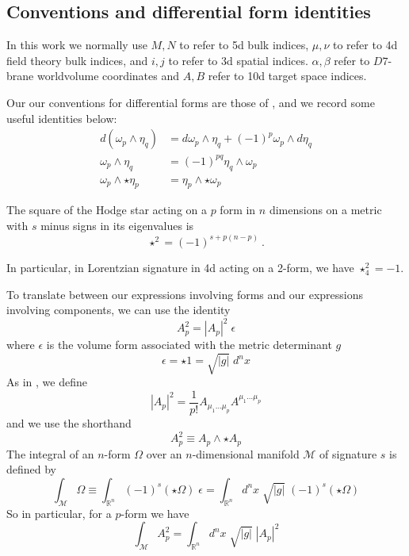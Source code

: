 \documentclass[aps,preprint,nofootinbib,preprintnumbers,eqsecnum,superscriptaddress]{revtex4}
\newcommand\om{\omega}
\begin{document}
\clearpage
\begin{appendix} 



\section{Conventions and differential form identities}
\label{conventions-appendix}
In this work we normally use $M,N$ to refer to 5d bulk indices, $\mu,\nu$ to refer to 4d field theory bulk indices, and $i,j$ to refer to 3d spatial indices. $\alpha, \beta$ refer to $D7$-brane worldvolume coordinates and $A, B$ refer to 10d target space indices.

Our our conventions for differential forms are those of \cite{carroll2004spacetime}, and we record some useful identities below:
\begin{align}
d(\om_p \wedge \eta_q) & = d\om_p \wedge \eta_q + (-1)^p \om_p \wedge d\eta_q \\
\om_p \wedge \eta_q & = (-1)^{pq} \eta_q \wedge \om_p \\
\om_p \wedge \star\eta_p & = \eta_p \wedge \star\om_p
\end{align}

The square of the Hodge star acting on a $p$ form in $n$ dimensions on a metric with $s$ minus signs in its eigenvalues is
\begin{equation}
\star^2 = (-1)^{s+p(n-p)} \ . 
\end{equation}

In particular, in Lorentzian signature in 4d acting on a 2-form, we have $\star_4^2 = -1$.

To translate between our expressions involving forms and our expressions involving components, we can use the identity
\begin{equation}
	A_p^2 = |A_p|^2 \; \epsilon
\end{equation}
where $\epsilon$ is the volume form associated with the metric determinant $g$
\begin{equation}
	\epsilon = \star 1 = \sqrt{|g|} \; d^n x
\end{equation}
As in \cite{Polchinski:1998rr}, we define
\begin{equation}
	|A_p|^2 = \frac{1}{p!}A_{\mu_1 \ldots \mu_p}A^{\mu_1 \ldots \mu_p}
\end{equation}
and we use the shorthand
\begin{equation}
	A_p^2 \equiv A_p \wedge \star A_p
\end{equation}
The integral of an $n$-form $\Omega$ over an $n$-dimensional manifold $\mathcal{M}$ of signature $s$ is defined by 
\begin{equation}
	\int_\mathcal{M} \Omega \equiv \int_{\mathbb{R}^n} (-1)^s (\star \Omega) \; \epsilon = \int_{\mathbb{R}^n} d^n x \; \sqrt{|g|}\; (-1)^s (\star \Omega)
\end{equation}
So in particular, for a $p$-form we have
\begin{equation}
	\int_\mathcal{M} A_p^2 = \int_{\mathbb{R}^n} d^n x \; \sqrt{|g|}\; |A_p|^2
\end{equation}


\end{appendix}
\end{document}
